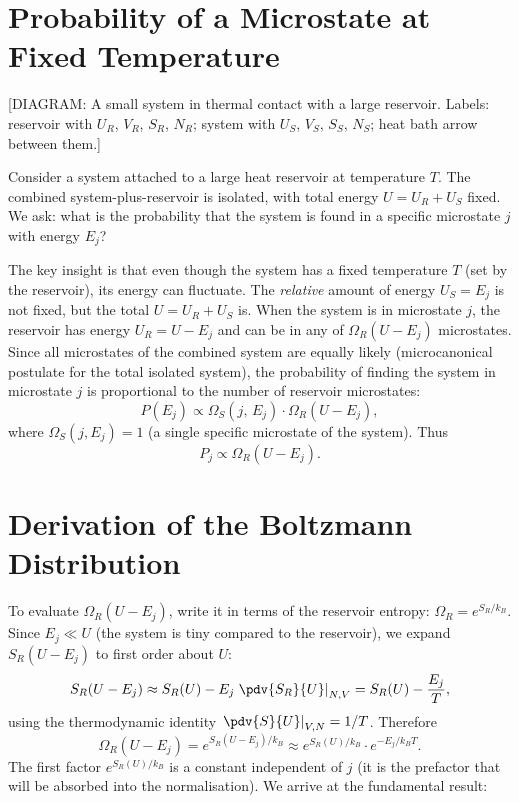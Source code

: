 \section{Probability of a Microstate at Fixed Temperature}

\begin{center}[DIAGRAM: A small system in thermal contact with a large reservoir. Labels: reservoir with $U_R$, $V_R$, $S_R$, $N_R$; system with $U_S$, $V_S$, $S_S$, $N_S$; heat bath arrow between them.]\end{center}

Consider a system attached to a large heat reservoir at temperature $T$. The combined system-plus-reservoir is isolated, with total energy $U = U_R + U_S$ fixed. We ask: what is the probability that the system is found in a specific microstate $j$ with energy $E_j$?

The key insight is that even though the system has a fixed temperature $T$ (set by the reservoir), its energy can fluctuate. The \emph{relative} amount of energy $U_S = E_j$ is not fixed, but the total $U = U_R + U_S$ is. When the system is in microstate $j$, the reservoir has energy $U_R = U - E_j$ and can be in any of $\Omega_R(U - E_j)$ microstates. Since all microstates of the combined system are equally likely (microcanonical postulate for the total isolated system), the probability of finding the system in microstate $j$ is proportional to the number of reservoir microstates:
\begin{equation}
    P(E_j) \propto \Omega_S(j,\,E_j) \cdot \Omega_R(U - E_j),
\end{equation}
where $\Omega_S(j, E_j) = 1$ (a single specific microstate of the system). Thus
\begin{equation}
    P_j \propto \Omega_R(U - E_j).
\end{equation}

\section{Derivation of the Boltzmann Distribution}

To evaluate $\Omega_R(U - E_j)$, write it in terms of the reservoir entropy: $\Omega_R = e^{S_R/k_B}$. Since $E_j \ll U$ (the system is tiny compared to the reservoir), we expand $S_R(U - E_j)$ to first order about $U$:
\begin{equation}
    S_R(U - E_j) \approx S_R(U) - E_j\left.\pdv{S_R}{U}\right|_{N,V} = S_R(U) - \frac{E_j}{T},
\end{equation}
using the thermodynamic identity $\left.\pdv{S}{U}\right|_{V,N} = 1/T$. Therefore
\begin{equation}
    \Omega_R(U - E_j) = e^{S_R(U-E_j)/k_B} \approx e^{S_R(U)/k_B}\cdot e^{-E_j/k_BT}.
\end{equation}
The first factor $e^{S_R(U)/k_B}$ is a constant independent of $j$ (it is the prefactor that will be absorbed into the normalisation). We arrive at the fundamental result:

